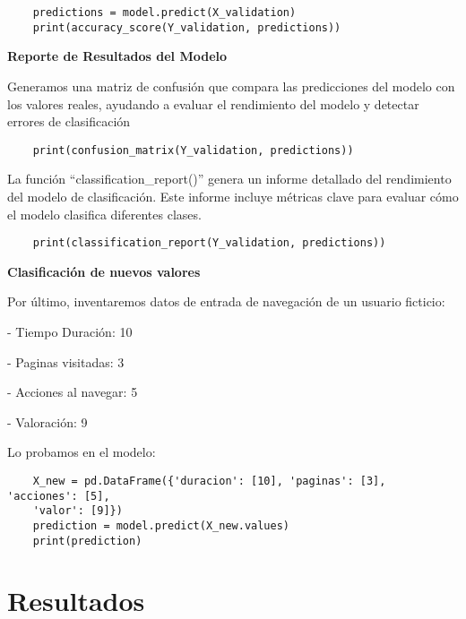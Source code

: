 \documentclass{pssbmac}
\begin{document}
\begin{lstlisting}
    predictions = model.predict(X_validation)
    print(accuracy_score(Y_validation, predictions))
\end{lstlisting}


\vspace{.3cm}


\textbf{Reporte de Resultados del Modelo}





Generamos una matriz de confusión que compara las predicciones del modelo con los valores reales, ayudando a evaluar el rendimiento del modelo y detectar errores de clasificación
\begin{lstlisting}
    print(confusion_matrix(Y_validation, predictions))
\end{lstlisting}


La función  ``classification\_report()'' genera un informe detallado del rendimiento del modelo de clasificación. Este informe incluye métricas clave para evaluar cómo el modelo clasifica diferentes clases.
\begin{lstlisting}
    print(classification_report(Y_validation, predictions))
\end{lstlisting}



\vspace{.3cm}

\textbf{Clasificación de nuevos valores}




Por último, inventaremos datos de entrada de navegación de un usuario ficticio:

- Tiempo Duración: 10


- Paginas visitadas: 3


- Acciones al navegar: 5


- Valoración: 9


\vspace{.2cm}


Lo probamos en el modelo:
\begin{lstlisting}
    X_new = pd.DataFrame({'duracion': [10], 'paginas': [3], 'acciones': [5],
    'valor': [9]})
    prediction = model.predict(X_new.values)
    print(prediction)
\end{lstlisting}



\section{Resultados}
\end{document}
